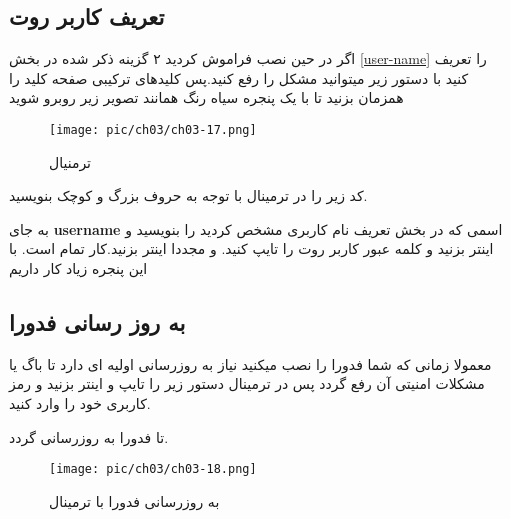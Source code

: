 \subsection{تعریف کاربر روت}\label{se-231}
اگر در حین نصب فراموش کردید ۲ گزینه ذکر شده در بخش 
\ref{user-name}
را تعریف کنید با دستور زیر میتوانید مشکل را رفع کنید.پس کلیدهای ترکیبی
صفحه کلید را همزمان بزنید تا با یک پنجره سیاه رنگ همانند تصویر زیر روبرو شوید
\begin{figure}[H]%
	\caption{ترمنیال}
	\begin{center}
		\texttt{[image: pic/ch03/ch03-17.png]}
	\end{center}
	\label{pic-25}
\end{figure} 
کد زیر را در ترمینال با توجه به حروف بزرگ و کوچک بنویسید.
\begin{flushleft}
\end{flushleft}
به جای 
\textbf{username}
اسمی که در بخش تعریف نام کاربری مشخص کردید را بنویسید و اینتر بزنید و کلمه عبور کاربر روت را تایپ کنید. و مجددا اینتر بزنید.کار تمام است. با این پنجره زیاد کار داریم
\subsection{به روز رسانی فدورا}\label{se-232}
معمولا زمانی که شما فدورا را نصب میکنید نیاز به روزرسانی اولیه ای دارد تا باگ یا مشکلات امنیتی آن رفع گردد پس در ترمینال دستور زیر را تایپ و اینتر بزنید و رمز کاربری خود را وارد کنید.
\begin{flushleft}
\end{flushleft}
تا فدورا به روزرسانی گردد.
\begin{figure}[H]%
	\caption{به روزرسانی فدورا با ترمینال}
	\begin{center}
		\texttt{[image: pic/ch03/ch03-18.png]}
	\end{center}
	\label{pic-26}
\end{figure}
